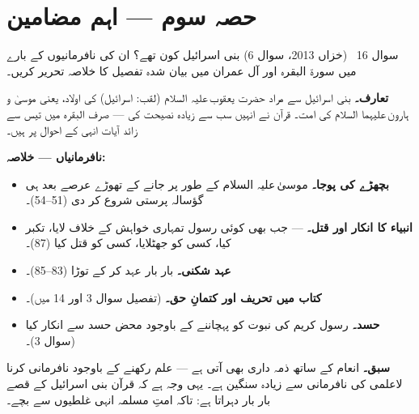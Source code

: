 
\section*{حصہ سوم --- اہم مضامین}

\begin{sawal}{سوال \textenglish{16} \ \textnormal{\small(خزاں \textenglish{2013}، سوال \textenglish{6})}}
بنی اسرائیل کون تھے؟ ان کی نافرمانیوں کے بارے میں سورۃ البقرہ اور آل عمران
میں بیان شدہ تفصیل کا خلاصہ تحریر کریں۔
\end{sawal}

\begin{hal}
\textbf{تعارف۔} بنی اسرائیل سے مراد حضرت یعقوب\,علیہ السلام (لقب: اسرائیل)
کی اولاد، یعنی موسیٰ و ہارون\,علیہما السلام کی امت۔ قرآن نے انہیں سب سے
زیادہ نصیحت کی --- صرف البقرہ میں تیس سے زائد آیات انہی کے احوال پر ہیں۔

\medskip
{}

\medskip
\textbf{نافرمانیاں --- خلاصہ:}
\begin{itemize}\setlength{\itemsep}{1pt}
  \item \textbf{بچھڑے کی پوجا۔} موسیٰ\,علیہ السلام کے طور پر جانے کے تھوڑے
        عرصے بعد ہی گؤسالہ پرستی شروع کر دی (\textenglish{51--54})۔
  \item \textbf{انبیاء کا انکار اور قتل۔}  --- جب بھی کوئی رسول تمہاری خواہش کے خلاف
        لایا، تکبر کیا، کسی کو جھٹلایا، کسی کو قتل کیا (\textenglish{87})۔
  \item \textbf{عہد شکنی۔} بار بار عہد کر کے توڑا (\textenglish{83--85})۔
  \item \textbf{کتاب میں تحریف اور کتمانِ حق۔} (تفصیل سوال \textenglish{3}
        اور \textenglish{14} میں)۔
  \item \textbf{حسد۔} رسول کریم \saw کی نبوت کو پہچاننے کے باوجود محض حسد سے
        انکار کیا (سوال \textenglish{3})۔
\end{itemize}

\medskip
\textbf{سبق۔} انعام کے ساتھ ذمہ داری بھی آتی ہے --- علم رکھنے کے باوجود
نافرمانی کرنا لاعلمی کی نافرمانی سے زیادہ سنگین ہے۔ یہی وجہ ہے کہ قرآن بنی
اسرائیل کے قصے بار بار دہراتا ہے: تاکہ امتِ مسلمہ انہی غلطیوں سے بچے۔
\end{hal}

